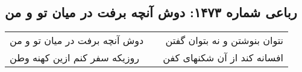 \begin{center}
\section*{رباعی شماره ۱۴۷۳: دوش آنچه برفت در میان تو و من}
\label{sec:1473}
\begin{longtable}{l p{0.5cm} r}
دوش آنچه برفت در میان تو و من
&&
نتوان بنوشتن و نه بتوان گفتن
\\
روزیکه سفر کنم ازین کهنه وطن
&&
افسانه کند از آن شکنهای کفن
\\
\end{longtable}
\end{center}

